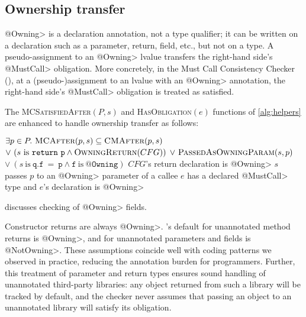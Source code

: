 \subsection{Ownership transfer}
\label{sec:ownership-transfer}

\<@Owning> is a declaration annotation, not a type qualifier; it can be
written on a declaration such as a parameter, return, field, etc., but not
on a type.
A pseudo-assignment to an \<@Owning> lvalue transfers the right-hand side's
\<@MustCall> obligation.
More concretely, in the Must Call Consistency Checker
(), at a (pseudo-)assignment to an lvalue with
an \<@Owning> annotation, the right-hand side's
\<@MustCall> obligation is treated as satisfied.

The \textsc{MCSatisfiedAfter}$(P,s)$ and \textsc{HasObligation}$(e)$ functions 
of \cref{alg:helpers} are enhanced to handle ownership transfer as follows:
\begin{algorithmic}
  \State \Return $\exists p \in P .\ \textsc{MCAfter}(p,s) \subseteq \textsc{CMAfter}(p,s)$ \newline
  \hspace*{6em} $\vee\ (s \mathrm{\ is\ } \mathtt{return\ p} \wedge \textsc{OwningReturn}(CFG))$ \newline
  \hspace*{6em} $\vee\ \textsc{PassedAsOwningParam}(s,p)$\newline
  \hspace*{6em} $\vee\ (s \mathrm{\ is\ } \mathtt{q.f\ =\ p} \wedge \mathtt{f} \mathrm{\ is\ } \mathtt{@Owning})$
  \EndProcedure
  \State \Return $CFG$'s return declaration is \<@Owning>
  \EndProcedure
  \State \Return $s$ passes $p$ to an \<@Owning> parameter of a callee
  \EndProcedure
  \State \Return $e$ has a declared \<@MustCall> type and $e$'s declaration is \<@Owning>
  \EndProcedure
\end{algorithmic}
 discusses checking of \<@Owning> fields.

Constructor returns are always \<@Owning>.
\Tool's default for unannotated method returns is \<@Owning>,
and for unannotated parameters and fields is \<@NotOwning>.  These assumptions
coincide well with coding patterns we observed in practice, reducing the
annotation burden for programmers.  Further, this treatment of parameter and
return types ensures sound handling of unannotated third-party libraries: any
object returned from such a library will be tracked by default, and the checker
never assumes that passing an object to an unannotated library will satisfy its obligation.

